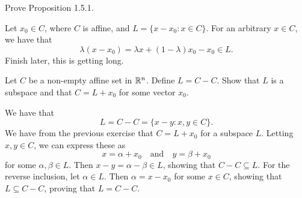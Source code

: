 \begin{exercise}
  Prove Proposition 1.5.1.
\end{exercise}

\begin{solution}
  Let $x_0 \in C$, where $C$ is affine, and $L = \{ x - x_0 : x \in C \}$.
  For an arbitrary $x \in C$, we have that
  \begin{equation}
    \lambda (x - x_0) = \lambda x + (1 - \lambda) x_0 - x_0 \in L.
  \end{equation}
  Finish later, this is getting long.
\end{solution}

\begin{exercise}
  Let $C$ be a non-empty affine set in $\mathbb{R}^n$.
  Define $L = C - C$.
  Show that $L$ is a subspace and that $C = L + x_0$ for some vector $x_0$.
\end{exercise}

\begin{solution}
  We have that
  \begin{equation}
    L = C - C = \{ x - y : x, y \in C \}.
  \end{equation}
  We have from the previous exercise that $C = L + x_0$ for a subspace $L$.
  Letting $x,y \in C$, we can express these as
  \begin{equation}
    x = \alpha + x_0
    \quad\text{and}\quad
    y = \beta + x_0
  \end{equation}
  for some $\alpha, \beta \in L$.
  Then $x - y = \alpha - \beta \in L$, showing that $C - C \subseteq L$.
  For the reverse inclusion, let $\alpha \in L$.
  Then $\alpha = x - x_0$ for some $x \in C$, showing that $L \subseteq C - C$, proving that $L = C - C$.
\end{solution}
